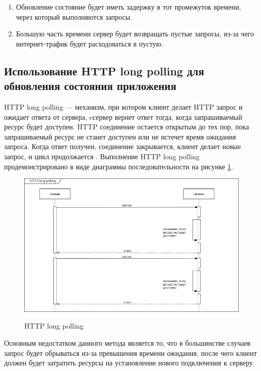 \begin{enumerate} 
  \item Обновление состояние будет иметь задержку в тот промежуток времени, через который выполняются запросы.
  
  \item Большую часть времени сервер будет возвращать пустые запросы, из-за чего интернет-трафик будет расходоваться в пустую.
\end{enumerate}

\subsection{Использование HTTP long polling для обновления состояния приложения}

HTTP long polling — механизм, при котором клиент делает HTTP запрос и ожидает ответа от сервера, cсервер вернет ответ тогда, когда запрашиваемый ресурс будет доступен. HTTP соединение остается открытым до тех пор, пока запрашиваемый ресурс не станет доступен или не истечет время ожидания запроса. Когда ответ получен, соединение закрывается, клиент делает новые запрос, и цикл продолжается \cite{HttpLongPolling}. Выполнение HTTP long polling продемонстрировано в виде диаграммы последовательности на рисунке \ref{fig:http-longpolling}. 

\begin{figure}[H]
\begin{center}
\includegraphics[width=1.0\hsize]{fig/http-longpolling.png}\\[2mm]
\caption{HTTP long polling}\label{fig:http-longpolling}
\end{center}
\end{figure}

Основным недостатком данного метода является то, что в большинстве случаев запрос будет обрываться из-за превышения времени ожидания, после чего клиент должен будет затратить ресурсы на установление нового подключения к серверу.

